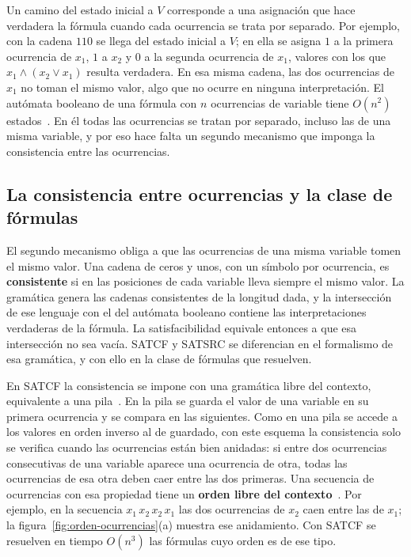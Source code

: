 \documentclass{report}
\theoremstyle{definition}
\theoremstyle{plain}
\theoremstyle{remark}
\begin{document}
Un camino del estado inicial a $V$ corresponde a una asignación que hace
verdadera la fórmula cuando cada ocurrencia se trata por separado. Por
ejemplo, con la cadena $110$ se llega del estado inicial a $V$; en ella
se asigna $1$ a la primera ocurrencia de $x_1$, $1$ a $x_2$ y $0$ a la
segunda ocurrencia de $x_1$, valores con los que $x_1 \wedge (x_2 \vee
x_1)$ resulta verdadera. En esa misma cadena, las dos ocurrencias de
$x_1$ no toman el mismo valor, algo que no ocurre en ninguna interpretación.
El autómata booleano de una fórmula con $n$ ocurrencias de variable
tiene $O(n^2)$ estados~\cite{fernandezarias2007}. En él todas las
ocurrencias se tratan por separado, incluso las de una misma variable, y
por eso hace falta un segundo mecanismo que imponga la consistencia
entre las ocurrencias.

\subsection{La consistencia entre ocurrencias y la clase de fórmulas}
\label{subsec:consistencia-clase}

El segundo mecanismo obliga a que las ocurrencias de una misma variable
tomen el mismo valor. Una cadena de ceros y unos, con un símbolo por
ocurrencia, es \textbf{consistente} si en las posiciones de cada variable
lleva siempre el mismo valor. La gramática genera las cadenas
consistentes de la longitud dada, y la intersección de ese lenguaje con
el del autómata booleano contiene las interpretaciones verdaderas de la
fórmula. La satisfacibilidad equivale entonces a que esa intersección no
sea vacía. SATCF y SATSRC se diferencian en el formalismo de esa
gramática, y con ello en la clase de fórmulas que resuelven.

En SATCF la consistencia se impone con una gramática libre del contexto,
equivalente a una pila~\cite{fernandezarias2007}. En la pila se guarda
el valor de una variable en su primera ocurrencia y se compara en las
siguientes. Como en una pila se accede a los valores en orden inverso al
de guardado, con este esquema la consistencia solo se verifica cuando
las ocurrencias están bien anidadas: si entre dos ocurrencias
consecutivas de una variable aparece una ocurrencia de otra, todas las
ocurrencias de esa otra deben caer entre las dos primeras. Una secuencia
de ocurrencias con esa propiedad tiene un \textbf{orden libre del
contexto}~\cite{fernandezarias2007}. Por ejemplo, en la secuencia
$x_1\,x_2\,x_2\,x_1$ las dos ocurrencias de $x_2$ caen entre las de
$x_1$; la figura~\ref{fig:orden-ocurrencias}(a) muestra ese anidamiento.
Con SATCF se resuelven en tiempo $O(n^3)$ las fórmulas cuyo orden es de
ese tipo.
\end{document}
